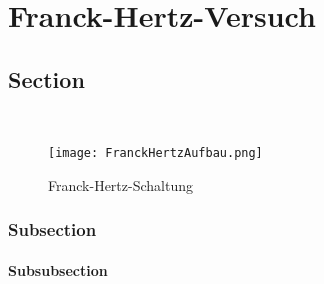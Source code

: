 \chapter{Franck-Hertz-Versuch}

\section{Section}
\
\begin{figure}[H]
    \centering
    \texttt{[image: FranckHertzAufbau.png]}
    \caption{Franck-Hertz-Schaltung}
    \label{fig:FrankHertzSchaltung}    
\end{figure}

\subsection{Subsection}

\subsubsection{Subsubsection}

